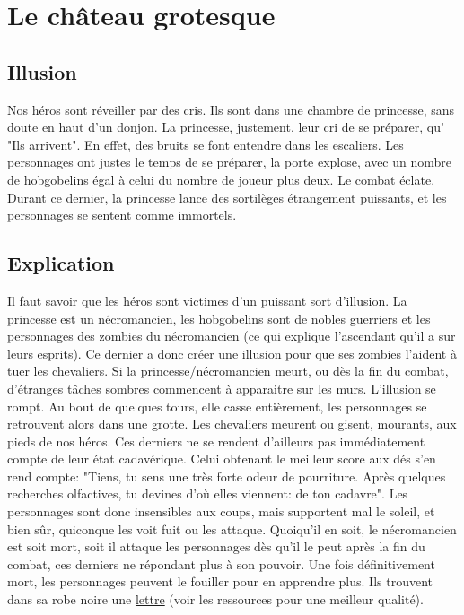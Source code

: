 \documentclass[a4paper, 11pt]{article}
\begin{document}
\section{Le château grotesque}
\subsection{Illusion}
Nos héros sont réveiller par des cris. Ils sont dans une chambre de princesse, sans doute en haut d'un donjon. La princesse, justement, leur cri de se préparer, qu' "Ils arrivent". En effet, des bruits se font entendre dans les escaliers. Les personnages ont justes le temps de se préparer, la porte explose, avec un nombre de hobgobelins égal à celui du nombre de joueur plus deux. Le combat éclate. Durant ce dernier, la princesse lance des sortilèges étrangement puissants, et les personnages se sentent comme immortels.

\subsection{Explication} 
Il faut savoir que les héros sont victimes d'un puissant sort d'illusion. La princesse est un nécromancien, les hobgobelins sont de nobles guerriers et les personnages des zombies du nécromancien (ce qui explique l'ascendant qu'il a sur leurs esprits). Ce dernier a donc créer une illusion pour que ses zombies l'aident à tuer les chevaliers. Si la princesse/nécromancien meurt, ou dès la fin du combat, d'étranges tâches sombres commencent à apparaitre sur les murs. L'illusion se rompt. Au bout de quelques tours, elle casse entièrement, les personnages se retrouvent alors dans une grotte.
\newline
Les chevaliers meurent ou gisent, mourants, aux pieds de nos héros. Ces derniers ne se rendent d’ailleurs pas immédiatement compte de leur état  cadavérique. Celui obtenant le meilleur score aux dés s'en rend compte: "Tiens, tu sens une très forte odeur de pourriture. Après quelques recherches olfactives, tu devines d'où elles viennent: de ton cadavre". Les personnages sont donc insensibles aux coups, mais supportent mal le soleil, et bien sûr, quiconque les voit fuit ou les attaque.
\newline
Quoiqu'il en soit, le nécromancien est soit mort, soit il attaque les personnages dès qu'il le peut après la fin du combat, ces derniers ne répondant plus à son pouvoir. Une fois définitivement mort, les personnages peuvent le fouiller pour en apprendre plus. Ils trouvent dans sa robe noire une \hyperlink{lettre}{lettre} (voir les ressources pour une meilleur qualité).
\end{document}
